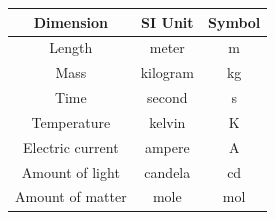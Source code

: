 \documentclass[12pt]{article}
\begin{document}
\begin{center}
    \begin{tabular}{|c|c|c|}
        \hline
        \textbf{Dimension} & \textbf{SI Unit} & \textbf{Symbol} \\
        \hline
        Length & meter & m \\
        \hline
        Mass & kilogram & kg \\
        \hline
        Time & second & s \\
        \hline
        Temperature & kelvin & K \\
        \hline
        Electric current & ampere & A \\
        \hline
        Amount of light & candela & cd \\
        \hline
        Amount of matter & mole & mol \\
        \hline
    \end{tabular}
\end{center}
\end{document}
